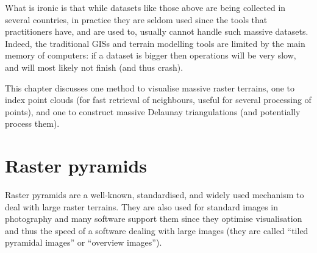 %

What is ironic is that while datasets like those above are being collected in several countries, in practice they are seldom used since the tools that practitioners have, and are used to, usually cannot handle such massive datasets. 
Indeed, the traditional GISs and terrain modelling tools are limited by the main memory of computers: if a dataset is bigger then operations will be very slow, and will most likely not finish (and thus crash).

%

This chapter discusses one method to visualise massive raster terrains, one to index point clouds (for fast retrieval of neighbours, useful for several processing of points), and one to construct massive Delaunay triangulations (and potentially process them).



%
\section{Raster pyramids}%

Raster pyramids are a well-known, standardised, and widely used mechanism to deal with large raster terrains.
They are also used for standard images in photography and many software support them since they optimise visualisation and thus the speed of a software dealing with large images (they are called ``tiled pyramidal images'' or ``overview images'').

